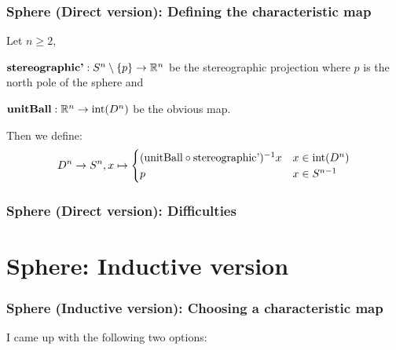 \documentclass{beamer}
\begin{document}
\begin{frame}
  \frametitle{Sphere (Direct version): Defining the characteristic map}
  Let $n \ge 2$, 
  
  $\text{\textbf{stereographic'}}: S^n \setminus \{p\} \to \mathbb{R}^n$ be the stereographic projection
  where $p$ is the north pole of the sphere and

  $\text{\textbf{unitBall}}: \mathbb{R}^n \to \text{int}(D^n)$ be the obvious map. 
  
  Then we define: 
  \begin{equation*}
  D^n \to S^n, x \mapsto 
  \begin{cases}
  (\text{unitBall} \circ \text{stereographic'})^{-1} x & x \in \text{int}(D^n) \\
  p & x \in S^{n - 1}
  \end{cases}
  \end{equation*}
\end{frame}

\begin{frame}
  \frametitle{Sphere (Direct version): Difficulties}
  \begin{itemize}
  \end{itemize}
\end{frame}

\section{Sphere: Inductive version}

\begin{frame}
  \frametitle{Sphere (Inductive version): Choosing a characteristic map}
  I came up with the following two options: 
  \begin{itemize}
    \begin{itemize}
    \end{itemize}
    \begin{itemize}
    \end{itemize}
  \end{itemize}
\end{frame}
\end{document}
